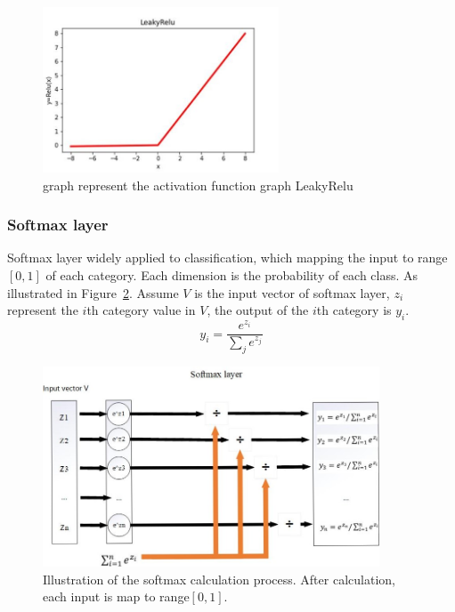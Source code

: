 \documentclass[runningheads]{llncs}
\begin{document}
\begin{figure}
	\centering\includegraphics[width=7cm]{leakyrelu.jpg}
	\caption{graph represent the activation function graph LeakyRelu} \label{fig4}
\end{figure}

\subsubsection{Softmax layer}
Softmax layer widely applied to classification, which mapping the input to range $[0,1]$ of each category. Each dimension is the probability of each class. As illustrated in Figure~\ref{fig5}. Assume $V$ is the input vector of softmax layer, $z_i$ represent the $i$th category value in $V$, the output of the $i$th category is $y_i$.
\begin{equation}
	y_i=\frac{e^{z_i}}{\sum_j e^{z_j}}
\end{equation}

\begin{figure}
	\centering\includegraphics[width=10cm]{softmax.jpg}
	\caption{Illustration of the softmax calculation process. After calculation, each input is map to range$[0,1]$.}
	\label{fig5}
\end{figure}
\end{document}
